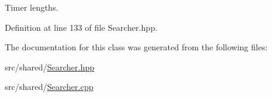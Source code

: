 Timer lengths. 



Definition at line 133 of file Searcher.\-hpp.



The documentation for this class was generated from the following files\-:\begin{DoxyCompactItemize}
\item 
src/shared/\hyperlink{Searcher_8hpp}{Searcher.\-hpp}\item 
src/shared/\hyperlink{Searcher_8cpp}{Searcher.\-cpp}\end{DoxyCompactItemize}
